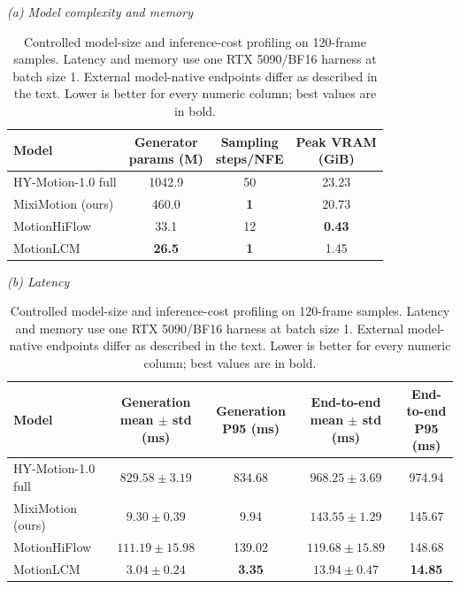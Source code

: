 \documentclass[runningheads]{llncs}
\begin{document}
\begin{table}
\caption{Controlled model-size and inference-cost profiling on 120-frame
samples. Latency and memory use one RTX 5090/BF16 harness at batch size 1.
External model-native endpoints differ as described in the text. Lower is
better for every numeric column; best values are in bold.}
\label{tab:cost-results}
\centering
\small
\setlength{\tabcolsep}{6pt}
\renewcommand{\arraystretch}{1.18}
\textit{(a) Model complexity and memory}\\[2pt]
\begin{tabular*}{\textwidth}{@{\extracolsep{\fill}}lccc@{}}
\hline
Model &
\shortstack{Generator\\params (M)} &
\shortstack{Sampling\\steps/NFE} &
\shortstack{Peak VRAM\\(GiB)} \\
\hline
HY-Motion-1.0 full & 1042.9 & 50 & 23.23 \\
MixiMotion (ours) & 460.0 & \textbf{1} & 20.73 \\
MotionHiFlow & 33.1 & 12 & \textbf{0.43} \\
MotionLCM & \textbf{26.5} & \textbf{1} & 1.45 \\
\hline
\end{tabular*}

\vspace{6pt}
\textit{(b) Latency}\\[2pt]
\setlength{\tabcolsep}{4pt}
\begin{tabular*}{\textwidth}{@{\extracolsep{\fill}}lcccc@{}}
\hline
Model &
\shortstack{Generation\\mean $\pm$ std (ms)} &
\shortstack{Generation\\P95 (ms)} &
\shortstack{End-to-end\\mean $\pm$ std (ms)} &
\shortstack{End-to-end\\P95 (ms)} \\
\hline
HY-Motion-1.0 full & $829.58\pm3.19$ & 834.68 & $968.25\pm3.69$ & 974.94 \\
MixiMotion (ours) & $9.30\pm0.39$ & 9.94 & $143.55\pm1.29$ & 145.67 \\
MotionHiFlow & $111.19\pm15.98$ & 139.02 & $119.68\pm15.89$ & 148.68 \\
MotionLCM & $\mathbf{3.04\pm0.24}$ & \textbf{3.35} & $\mathbf{13.94\pm0.47}$ & \textbf{14.85} \\
\hline
\end{tabular*}
\end{table}
\end{document}
